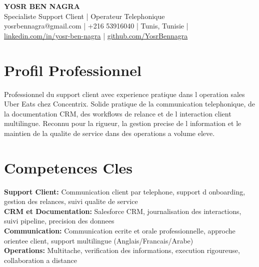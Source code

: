 \documentclass[10pt,a4paper]{article}
\begin{document}
\begin{center}
  {\Large\bfseries YOSR BEN NAGRA}\\[2pt]
  {\small Specialiste Support Client | Operateur Telephonique}\\[3pt]
  {\footnotesize yosrbennagra@gmail.com \;|\; +216 53916040 \;|\; Tunis, Tunisie \;|\; \href{https://www.linkedin.com/in/yosr-ben-nagra/}{linkedin.com/in/yosr-ben-nagra} \;|\; \href{https://github.com/YosrBennagra}{github.com/YosrBennagra}}
\end{center}

\section*{Profil Professionnel}
{\small
Professionnel du support client avec experience pratique dans l operation sales Uber Eats chez Concentrix. Solide pratique de la communication telephonique, de la documentation CRM, des workflows de relance et de l interaction client multilingue. Reconnu pour la rigueur, la gestion precise de l information et le maintien de la qualite de service dans des operations a volume eleve.
}

\vspace{4pt}

\section*{Competences Cles}
{\small
\textbf{Support Client:} Communication client par telephone, support d onboarding, gestion des relances, suivi qualite de service\\[2pt]
\textbf{CRM et Documentation:} Salesforce CRM, journalisation des interactions, suivi pipeline, precision des donnees\\[2pt]
\textbf{Communication:} Communication ecrite et orale professionnelle, approche orientee client, support multilingue (Anglais/Francais/Arabe)\\[2pt]
\textbf{Operations:} Multitache, verification des informations, execution rigoureuse, collaboration a distance
}

\vspace{6pt}
\end{document}
